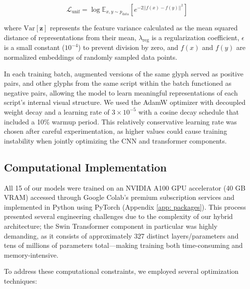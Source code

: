 \documentclass[11pt,a4paper,oneside]{report}
\begin{document}
\begin{equation}
\mathcal{L}_{\text{unif}} = \log\mathbb{E}_{x,y \sim p_\text{data}}\left[ e^{-2||f(x) - f(y)||^2} \right]
\end{equation}

where $\text{Var}[\mathbf{z}]$ represents the feature variance calculated as the mean squared distance of representations from their mean, $\lambda_{\text{reg}}$ is a regularization coefficient, $\epsilon$ is a small constant ($10^{-4}$) to prevent division by zero, and $f(x)$ and $f(y)$ are normalized embeddings of randomly sampled data points. 

In each training batch, augmented versions of the same glyph served as positive pairs, and other glyphs from the same script within the batch functioned as negative pairs, allowing the model to learn meaningful representations of each script's internal visual structure. We used the AdamW optimizer with decoupled weight decay and a learning rate of $3 \times 10^{-5}$ with a cosine decay schedule that included a 10\% warmup period. This relatively conservative learning rate was chosen after careful experimentation, as higher values could cause training instability when jointly optimizing the CNN and transformer components.

\subsection{Computational Implementation}
\noindent\hspace{1cm}
All 15 of our models were trained on an NVIDIA A100 GPU accelerator (40 GB VRAM) accessed through Google Colab's premium subscription services and implemented in Python using PyTorch (Appendix \ref{app: packages}). This process presented several engineering challenges due to the complexity of our hybrid architecture; the Swin Transformer component in particular was highly demanding, as it consists of approximately 327 distinct layers/parameters and tens of millions of parameters total—making training both time-consuming and memory-intensive.

To address these computational constraints, we employed several optimization techniques:
\end{document}
